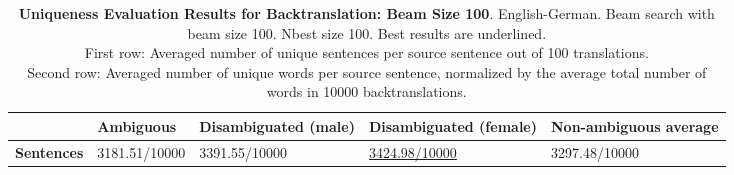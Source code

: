 \begin{table} 
    \begin{tabularx}{\linewidth}{|X|XXXX|}
        \hline
         & \textbf{Ambiguous} & \textbf{Disambiguated (male)} & \textbf{Disambiguated (female)} & \textbf{Non-ambiguous average} \\ \hline
         \textbf{Sentences} & 3181.51/10000 & 3391.55/10000 & \underline{3424.98/10000} & 3297.48/10000 \\ \hline
    \end{tabularx}
    \caption{\textbf{Uniqueness Evaluation Results for Backtranslation: Beam Size 100}. English-German. Beam search with beam size 100. Nbest size 100. Best results are underlined. \\ First row: Averaged number of unique sentences per source sentence out of 100 translations. \\ Second row: Averaged number of unique words per source sentence, normalized by the average total number of words in 10000 backtranslations.}
    \label{tab:uniqueness_backtranslation_100}
\end{table}

